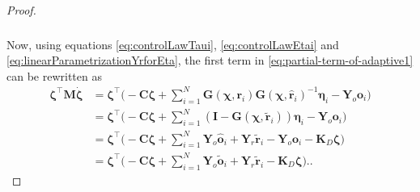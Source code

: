 \begin{proof}
\begin{align}
\begin{split}
    \end{split} \label{eq:partial-term-of-adaptive1}
    \end{align} 
    Now, using equations \eqref{eq:controlLawTaui}, \eqref{eq:controlLawEtai} and \eqref{eq:linearParametrizationYrforEta}, the first term in \eqref{eq:partial-term-of-adaptive1} can be rewritten as
    \begin{align}
        \boldsymbol{\zeta}^\top \mathbf {M} \dot{\boldsymbol{\zeta}} &= \boldsymbol{\zeta}^\top\Biggl( - \mathbf{C}\boldsymbol{\zeta} + \sum_{i=1}^N\mathbf{G}(\boldsymbol{\chi}, \mathbf{r}_i)\mathbf{G}(\boldsymbol{\chi}, \hat{\mathbf{r}}_i)^{-1}\boldsymbol{\eta}_i - \mathbf{Y}_o\mathbf{o}_i\Biggr)\\
        &= \boldsymbol{\zeta}^\top\Biggl(- \mathbf{C}\boldsymbol{\zeta}+\sum_{i=1}^N(\mathbf{I}-\mathbf{G}(\boldsymbol{\chi}, \widetilde{\mathbf{r}}_i))\boldsymbol{\eta}_i - \mathbf{Y}_o\mathbf{o}_i \Biggr)\\
        &= \boldsymbol{\zeta}^\top\Biggl(- \mathbf{C}\boldsymbol{\zeta} + \sum_{i=1}^N \mathbf{Y}_o\hat{\mathbf{o}}_i + \mathbf{Y}_r\widetilde{\mathbf{r}}_i - \mathbf{Y}_o\mathbf{o}_i- \mathbf{K}_D\boldsymbol{\zeta} \Biggr)\\
        &= \boldsymbol{\zeta}^\top\Biggl(- \mathbf{C}\boldsymbol{\zeta} + \sum_{i=1}^N \mathbf{Y}_o\widetilde{\mathbf{o}}_i + \mathbf{Y}_r\widetilde{\mathbf{r}}_i - \mathbf{K}_D\boldsymbol{\zeta} \Biggr). \label{eq:partial-term-of-adaptive2}.
    \end{align}


\end{proof}
